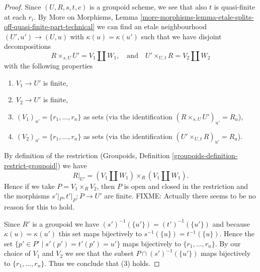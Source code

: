 \begin{proof}
Since $(U, R, s, t, c)$ is a groupoid scheme, we see that also
$t$ is quasi-finite at each $r_i$. By
More on Morphisms,
Lemma \ref{more-morphisms-lemma-etale-splits-off-quasi-finite-part-technical}
we can find an etale neighbourhood $(U', u') \to (U, u)$ with
$\kappa(u) = \kappa(u')$ such that we have disjoint decompositions
$$
R \times_{s, U} U' = V_1 \coprod W_1,
\quad\text{and}\quad
U' \times_{U, t} R = V_2 \coprod W_2
$$
with the following properties
\begin{enumerate}
\item $V_1 \to U'$ is finite,
\item $V_2 \to U'$ is finite,
\item $(V_1)_{u'} = \{r_1, \ldots, r_n\}$ as sets (via the identification
$(R \times_{s, U} U')_{u'} = R_u$),
\item $(V_2)_{u'} = \{r_1, \ldots, r_n\}$ as sets (via the identification
$(U' \times_{U, t} R)_{u'} = R_u$).
\end{enumerate}
By definition of the restriction
(Groupoids, Definition \ref{groupoids-definition-restrict-groupoid})
we have
$$
R|_{U'} = (V_1 \coprod W_1) \times_R (V_1 \coprod W_1).
$$
Hence if we take $P = V_1 \times_R V_2$, then $P$ is open and closed
in the restriction and the morphisms $s'|_P, t'|_P : P \to U'$ are finite.
FIXME: Actually there seems to be no reason for this to hold.

\medskip\noindent
Since $R'$ is a groupoid we have $(s')^{-1}(\{u'\}) = (t')^{-1}(\{u'\})$
and because $\kappa(u) = \kappa(u')$ this set maps bijectively to
$s^{-1}(\{u\}) = t^{-1}(\{u\})$. Hence the set
$\{p' \in P' \mid s'(p') = t'(p') = u'\}$
maps bijectively to $\{r_1, \ldots, r_n\}$.
By our choice of $V_1$ and $V_2$ we see that the subset
$P \cap (s')^{-1}(\{u'\})$ maps bijectively
to $\{r_1, \ldots, r_n\}$. Thus we conclude that (3) holds.


\end{proof}
